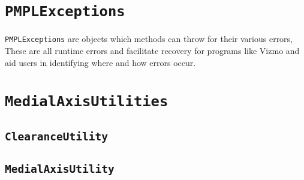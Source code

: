 \section{\texttt{PMPLExceptions}}

\texttt{PMPLExceptions} are objects which methods can throw for their various
errors, These are all runtime errors and facilitate recovery for programs like
Vizmo and aid users in identifying where and how errors occur.

\section{\texttt{MedialAxisUtilities}}

\subsection{\texttt{ClearanceUtility}}

\subsection{\texttt{MedialAxisUtility}}

